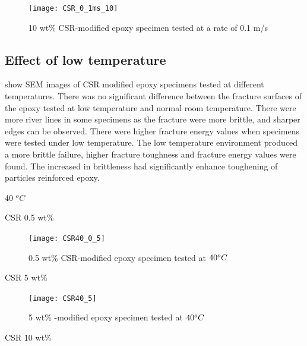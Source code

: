 \documentclass[numbers=noendperiod,chapterprefix=on]{icldt} %
\begin{document}
{\begin{figure}[!htpb]
\centering
\texttt{[image: CSR\_0\_1ms\_10]} 
\caption{10 wt\% CSR-modified epoxy specimen tested at a rate of 0.1 m/s} \label{CSR_0_1ms_10}
\end{figure}
\FloatBarrier


\subsection{Effect of low temperature}
show SEM images of CSR modified epoxy specimens tested at different temperatures. There was no significant difference between the fracture surfaces of the epoxy tested at low temperature and normal room temperature. There were more river lines in some specimens as the fracture were more brittle, and sharper edges can be observed. There were higher fracture energy values when specimens were tested under low temperature. The low temperature environment produced a more brittle failure, higher fracture toughness and fracture energy values were found. The increased in brittleness had significantly enhance toughening of particles reinforced epoxy. 

40 $^oC$

CSR 0.5 wt\%

\begin{figure}[!htpb]
\centering
\texttt{[image: CSR40\_0\_5]} 
\caption{0.5 wt\% CSR-modified epoxy specimen tested at $\-40 ^oC$}\label{CSR40_0_5}
\end{figure}
\FloatBarrier

CSR 5 wt\%

\begin{figure}[!htpb]
\centering
\texttt{[image: CSR40\_5]} 
\caption{5 wt\% -modified epoxy specimen tested at $\-40 ^oC$}\label{CSR40_5}
\end{figure}
\FloatBarrier

CSR 10 wt\%

}
\end{document}
